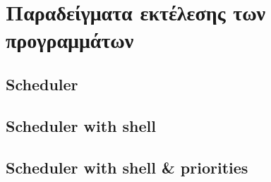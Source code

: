 \documentclass[a4paper,10pt]{article} \usepackage{anysize}
\begin{document}
\subsection{}
\inputminted[linenos,fontsize=\footnotesize,frame=leftline]{c}{files/scheduler-shell_1.3.c}

\section*{Παραδείγματα εκτέλεσης των προγραμμάτων}
\def\thesubsection {Πρόγραμμα \arabic{section}.\arabic{subsection}:}
\setcounter{subsection}{0}
\subsection{Scheduler}

\subsection{Scheduler with shell}

\subsection{Scheduler with shell \& priorities}

\end{document}

